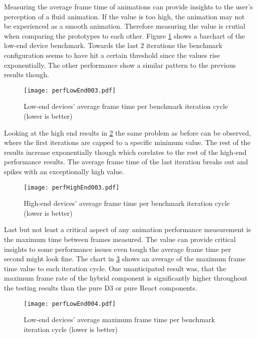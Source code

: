 
Measuring the average frame time of animations can provide insights to the user's perception of a fluid animation. If the value is too high, the animation may not be experienced as a smooth animation. Therefore measuring the value is crutial when comparing the prototypes to each other. Figure \ref{fig:perfLowEnd003} shows a barchart of the low-end device benchmark. Towards the last 2 iterations the benchmark configuration seems to have hit a certain threshold since the values rise exponentially. The other performance show a similar pattern to the previous results though.

\begin{figure}
\centering
\texttt{[image: perfLowEnd003.pdf]}
\caption{Low-end devices' average frame time per benchmark iteration cycle (lower is better)}
\label{fig:perfLowEnd003}
\end{figure}

Looking at the high end results in \ref{fig:perfHighEnd003} the same problem as before can be observed, where the first iterations are capped to a specific minimum value. The rest of the results increase exponentially though which corelates to the rest of the high-end performance results. The average frame time of the last iteration breaks out and spikes with an exceptionally high value.

\begin{figure}
\centering
\texttt{[image: perfHighEnd003.pdf]}
\caption{High-end devices' average frame time per benchmark iteration cycle (lower is better)}
\label{fig:perfHighEnd003}
\end{figure}

Last but not least a critical aspect of any animation performance measurement is the maximum time between frames measured. The value can provide critical insights to some performance issues even tough the average frame time per second might look fine. The chart in \ref{fig:perfLowEnd004} shows an average of the maximum frame time value to each iteration cycle. One unanticipated result was, that the maximum frame rate of the hybrid component is significantly higher throughout the testing results than the pure D3 or pure React components.

\begin{figure}
\centering
\texttt{[image: perfLowEnd004.pdf]}
\caption{Low-end devices' average maximum frame time per benchmark iteration cycle (lower is better)}
\label{fig:perfLowEnd004}
\end{figure}

